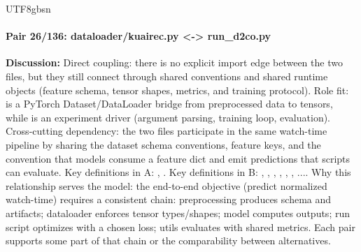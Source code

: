 \documentclass[11pt]{article}
\begin{document}
\begin{CJK*}{UTF8}{gbsn}
\paragraph{Pair 26/136: dataloader/kuairec.py <-> run\_d2co.py}
\textbf{Discussion:} Direct coupling: there is no explicit import edge between the two files, but they still connect through shared conventions and shared runtime objects (feature schema, tensor shapes, metrics, and training protocol). Role fit: \texttt{} is a PyTorch Dataset/DataLoader bridge from preprocessed data to tensors, while \texttt{} is an experiment driver (argument parsing, training loop, evaluation). Cross-cutting dependency: the two files participate in the same watch-time pipeline by sharing the dataset schema conventions, feature keys, and the convention that models consume a feature dict and emit predictions that scripts can evaluate. Key definitions in A: \texttt{}, \texttt{}. Key definitions in B: \texttt{}, \texttt{}, \texttt{}, \texttt{}, \texttt{}, \texttt{}, .... Why this relationship serves the model: the end-to-end objective (predict normalized watch-time) requires a consistent chain: preprocessing produces schema and artifacts; dataloader enforces tensor types/shapes; model computes outputs; run script optimizes with a chosen loss; utils evaluates with shared metrics. Each pair supports some part of that chain or the comparability between alternatives.


\end{CJK*}
\end{document}
